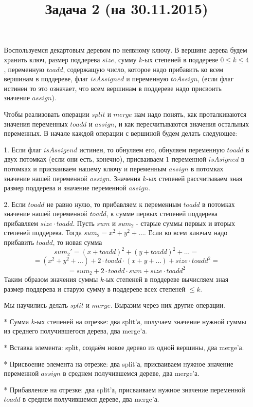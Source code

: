 \documentclass{article}
\date{}
\title{Задача 2 (на 30.11.2015)}
\begin{document}
\Large
\maketitle
Воспользуемся декартовым деревом по неявному ключу. В вершине дерева будем хранить ключ, размер поддерева $size$, сумму $k$-ых степеней в поддереве $0 \leqslant k \leqslant 4$, переменную $toadd$, содержащую число, которое надо прибавить ко всем вершинам в поддереве, флаг $isAssigned$ и переменную $toAssign$, (если флаг истинен то это означает, что всем вершинам в поддереве надо присвоить значение $assign$). 

Чтобы реализовать операции $split$ и $merge$ нам надо понять, как проталкиваются значения переменных $toadd$ и $assign$, и как пересчитываются значения остальных переменных. В начале каждой операции с вершиной будем делать следующее:

1. Если флаг $isAssigend$ истинен, то обнуляем его, обнуляем переменную $toadd$ в двух потомках (если они есть, конечно), присваиваем 1 переменной $isAsigned$ в потомках и присваиваем нашему ключу и переменным $assign$ в потомках значение нашей переменной $assign$. Значения $k$-ых степеней рассчитываем зная размер поддерева и значение переменной $assign$.

2. Если $toadd$ не равно нулю, то прибавляем к переменным $toadd$ в потомках значение нашей переменной $toadd$, к сумме первых степеней поддерева прибавляем $size \cdot toadd$. Пусть $sum$ и $sum_2$ - старые суммы первых и вторых степеней поддерева. Тогда $sum_2=x^2+y^2+\ldots$. Если ко всем ключам надо прибавить $toadd$, то новая сумма $$sum_2'=(x+toadd)^2+(y+toadd)^2+\ldots=$$
$$=(x^2+y^2+\ldots)+2 \cdot toadd \cdot (x+y+\ldots)+size\cdot toadd^2=$$
$$=sum_2+2 \cdot toadd \cdot sum + size \cdot toadd^2$$
Таким образом значения суммы $k$-ых степеней в поддереве вычисляем зная размер поддерева и старую сумму в поддереве всех степеней $\leqslant k$.

Мы научились делать $split$ и $merge$. Выразим через них другие операции.

* Сумма $k$-ых степеней на отрезке: два split'а, получаем значение нужной суммы из среднего получившегося дерева, два merge'а.

* Вставка элемента: split, создаём новое дерево из одной вершины, два merge'а.

* Присвоение элемента на отрезке: два split'а, присваиваем нужное значение переменной $assign$ в среднем получившемся дереве, два merge'а.

* Прибавление на отрезке: два split'а, присваиваем нужное значение переменной $toadd$ в среднем получившемся дереве, два merge'а.
\end{document}
